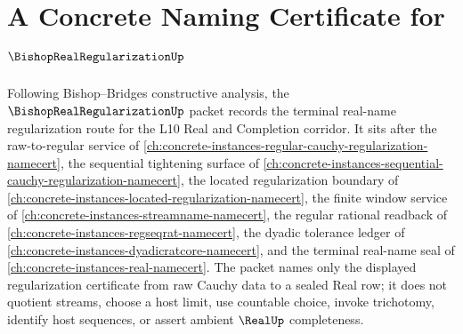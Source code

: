 \chapter{A Concrete Naming Certificate for $\BishopRealRegularizationUp$}
\label{ch:concrete-instances-bishop-real-regularization-namecert}

Following Bishop--Bridges constructive analysis, the $\BishopRealRegularizationUp$ packet records the terminal real-name regularization route for the L10 Real and Completion corridor. It sits after the raw-to-regular service of \autoref{ch:concrete-instances-regular-cauchy-regularization-namecert}, the sequential tightening surface of \autoref{ch:concrete-instances-sequential-cauchy-regularization-namecert}, the located regularization boundary of \autoref{ch:concrete-instances-located-regularization-namecert}, the finite window service of \autoref{ch:concrete-instances-streamname-namecert}, the regular rational readback of \autoref{ch:concrete-instances-regseqrat-namecert}, the dyadic tolerance ledger of \autoref{ch:concrete-instances-dyadicratcore-namecert}, and the terminal real-name seal of \autoref{ch:concrete-instances-real-namecert}. The packet names only the displayed regularization certificate from raw Cauchy data to a sealed Real row; it does not quotient streams, choose a host limit, use countable choice, invoke trichotomy, identify host sequences, or assert ambient $\RealUp$ completeness.

